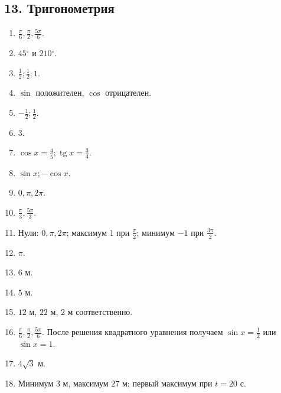 \documentclass[12pt,a4paper]{article}
\theoremstyle{definition}
\theoremstyle{plain}
\theoremstyle{remark}
\newcommand{\starmark}{\ensuremath{{}^{\ast}}}
\begin{document}
\subsection*{13. Тригонометрия}
\begin{enumerate}[label=13.\arabic*.,leftmargin=2.8em,itemsep=5pt]
\item \(\frac{\pi }{6},\allowbreak \frac{\pi }{2},\allowbreak \frac{5 \pi }{6}\).
\item \(45 {}^{\circ}\) и \(210 {}^{\circ}\).
\item \(\frac{1}{2};\allowbreak \frac{1}{2};\allowbreak 1\).
\item \(\sin \) положителен, \(\cos \) отрицателен.
\item \(- \frac{1}{2};\allowbreak \frac{1}{2}\).
\item \(3\).
\item \(\cos  x = \frac{4}{5};\allowbreak \operatorname{tg}  x = \frac{3}{4}\).
\item \(\sin  x;\allowbreak - \cos  x\).
\item \(0,\allowbreak \pi ,\allowbreak 2 \pi \).
\item \(\frac{\pi }{3},\allowbreak \frac{5 \pi }{3}\).
\item Нули: \(0,\allowbreak \pi ,\allowbreak 2 \pi \); максимум \(1\) при \(\frac{\pi }{2}\); минимум \(- 1\) при \(\frac{3 \pi }{2}\).
\item \(\pi \).
\item \(6\) м.
\item \(5\) м.
\item \(12\) м, \(22\) м, \(2\) м соответственно.
\item[\textbf{13.16.}\starmark] \(\frac{\pi}{6},\allowbreak \frac{\pi}{2},\allowbreak \frac{5\pi}{6}\). После решения квадратного уравнения получаем \(\sin x = \frac{1}{2}\) или \(\sin x = 1\).
\item[\textbf{13.17.}\starmark] \(4 \sqrt{3}\) м.
\item[\textbf{13.18.}\starmark] Минимум \(3\) м, максимум \(27\) м; первый максимум при \(t = 20\) с.
\end{enumerate}
\end{document}
